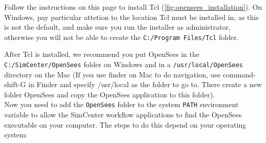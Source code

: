 Follow the instructions on this page to install Tcl (\autoref{fig:opensees_installation}). On Windows, pay particular attetion to the location Tcl must be installed in, as this is not the default, and make sure you run the installer as administrator, otherwise you will not be able to create the \texttt{C:/Program Files/Tcl} folder.

After Tcl is installed, we recommend you put OpenSees in the \texttt{C:/SimCenter/OpenSees} folder on Windows and in a \texttt{/usr/local/OpenSees} directory on the Mac (If you use finder on Mac to do navigation, use command-shift-G in Finder and specify /usr/local as the folder to go to. There create a new folder OpenSees and copy the OpenSees application to this folder).\\


Now  you need to add the \texttt{OpenSees} folder to the system \texttt{PATH} environment variable to allow the SimCenter workflow applications to find the OpenSees executable on your computer. The steps to do this depend on your operating system:

